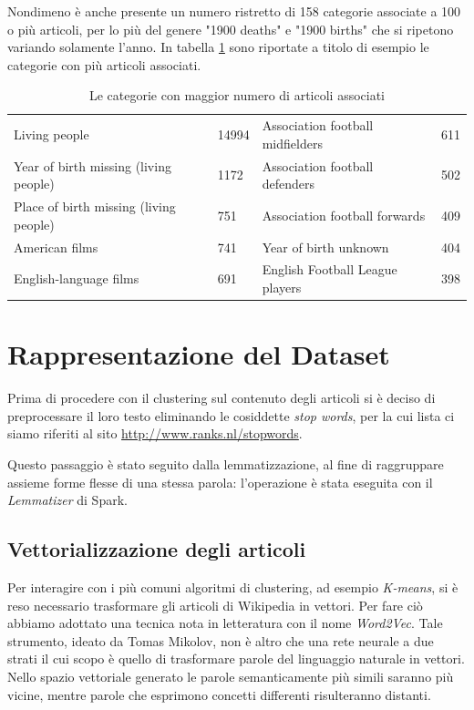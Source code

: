 \documentclass[
	11pt, %
	a4paper, %
	oneside, %
	headinclude,footinclude, %
	BCOR5mm, %
]{scrartcl}
\begin{document}
	Nondimeno è anche presente un numero ristretto di 158 categorie associate a 100 o più articoli, per lo più del genere "1900 deaths" e "1900 births" che si ripetono variando solamente l'anno.
	In tabella \ref{table:toptencategories} sono riportate a titolo di esempio le categorie con più articoli associati.

	\begin{table}[]
	\vspace*{0.2cm}
	\hspace*{1cm}
	\begin{tabular}{l|l||l|l}
	Living people & 14994 & Association football midfielders & 611 \\
	Year of birth missing (living people) & 1172 & Association football defenders & 502 \\
	Place of birth missing (living people) & 751 & Association football forwards & 409 \\
	American films & 741 & Year of birth unknown & 404 \\
	English-language films & 691 & English Football League players & 398 \\
	\end{tabular}
	\caption{Le categorie con maggior numero di articoli associati}
	\label{table:toptencategories}
	\end{table}


\section{Rappresentazione del Dataset} \label{sec:rappresentazione}
	Prima di procedere con il clustering sul contenuto degli articoli si è deciso di preprocessare il loro testo eliminando le cosiddette \emph{stop words}, per la cui lista ci siamo riferiti al sito \url{http://www.ranks.nl/stopwords}.
	

	Questo passaggio è stato seguito dalla lemmatizzazione, al fine di raggruppare assieme forme flesse di una stessa parola: l'operazione è stata eseguita con il \emph{Lemmatizer} di Spark.

	\subsection{Vettorializzazione degli articoli}
		Per interagire con i più comuni algoritmi di clustering, ad esempio \emph{K-means}, si è reso necessario trasformare gli articoli di Wikipedia in vettori.
		Per fare ciò abbiamo adottato una tecnica nota in letteratura con il nome \emph{Word2Vec}. Tale strumento, ideato da Tomas Mikolov, non è altro che una rete neurale a due strati il cui scopo è quello di trasformare parole del linguaggio naturale in vettori. Nello spazio vettoriale generato le parole semanticamente più simili saranno più vicine, mentre parole che esprimono concetti differenti risulteranno distanti.
\end{document}
